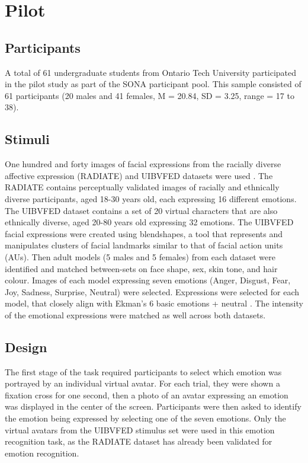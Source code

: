\section{Pilot}
\label{sec:Pilot}
\subsection{Participants}
A total of 61 undergraduate students from Ontario Tech University participated in the pilot study as part of the SONA participant pool.
This sample consisted of 61 participants (20 males and 41 females, M = 20.84, SD = 3.25, range = 17 to 38).

\subsection{Stimuli}
\label{sec:Stimuli}
One hundred and forty images of facial expressions from the racially diverse affective expression (RADIATE) and UIBVFED datasets were used \citep{conley_racially_2018, oliver_uibvfed_2020}.
The RADIATE contains perceptually validated images of racially and ethnically diverse participants, aged 18-30 years old, each expressing 16 different emotions. 
The UIBVFED dataset contains a set of 20 virtual characters that are also ethnically diverse, aged 20-80 years old expressing 32 emotions. 
The UIBVFED facial expressions were created using blendshapes, a tool that represents and manipulates clusters of facial landmarks similar to that of facial action units (AUs).
Then adult models (5 males and 5 females) from each dataset were identified and matched between-sets on face shape, sex, skin tone, and hair colour. 
Images of each model expressing seven emotions (Anger, Disgust, Fear, Joy, Sadness, Surprise, Neutral) were selected. 
Expressions were selected for each model, that closely align with Ekman's 6 basic emotions + neutral \citep{ekman1971constants}.
The intensity of the emotional expressions were matched as well across both datasets. 

\subsection{Design}
The first stage of the task required participants to select which emotion was portrayed by an individual virtual avatar.
For each trial, they were shown a fixation cross for one second, then a photo of an avatar expressing an emotion was displayed in the center of the screen.
Participants were then asked to identify the emotion being expressed by selecting one of the seven emotions. 
Only the virtual avatars from the UIBVFED stimulus set were used in this emotion recognition task, as the RADIATE dataset has already been validated for emotion recognition. 

